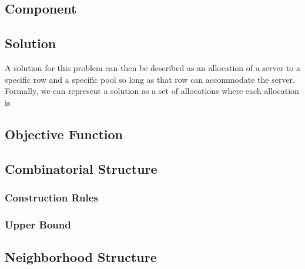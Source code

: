 \subsection{Component}



\subsection{Solution}

A solution for this problem can then be described as an allocation of a server
to a specific row and a specific pool so long as that row can accommodate the server.
Formally, we can represent a solution as a set of allocations where each allocation is

\subsection{Objective Function}


\subsection{Combinatorial Structure}

\subsubsection*{Construction Rules}

\subsubsection*{Upper Bound}

\subsection{Neighborhood Structure}

